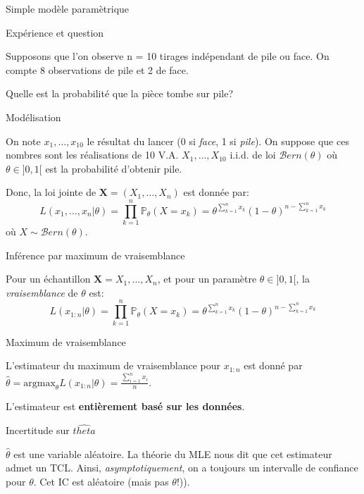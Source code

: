 \documentclass[9pt,ignorenonframetext,]{beamer}
\begin{document}
\begin{frame}{Simple modèle paramètrique}
\protect\hypertarget{simple-moduxe8le-paramuxe8trique}{}

\begin{block}{Expérience et question}

Supposons que l'on observe n = 10 tirages indépendant de pile ou face.
On compte 8 observations de pile et 2 de face.

Quelle est la probabilité que la pièce tombe sur pile?

\end{block}

\begin{block}{Modélisation}

On note \(x_1, \dots, x_{10}\) le résultat du lancer (0 si \emph{face},
1 si \emph{pile}). On suppose que ces nombres sont les réalisations de
10 V.A. \(X_1,\dots,X_{10}\) i.i.d. de loi \(\mathcal{B}ern(\theta)\) où
\(\theta \in ]0, 1[\) est la probabilité d'obtenir pile.

Donc, la loi jointe de \(\mathbf{X} = (X_1,\dots,X_{n})\) est donnée
par:
\[L(x_1,\dots, x_{n}\vert \theta) = \prod_{k = 1}^{n}\mathbb{P}_\theta(X = x_k) = \theta^{\sum_{k=1}^n x_k}\left(1 - \theta \right)^{n - \sum_{k=1}^n x_k}\]
où \(X \sim \mathcal{B}ern(\theta)\).

\end{block}

\end{frame}

\begin{frame}{Inférence par maximum de vraisemblance}
\protect\hypertarget{infuxe9rence-par-maximum-de-vraisemblance}{}

Pour un échantillon \(\mathbf{X} = X_1, \dots, X_n\), et pour un
paramètre \(\theta \in ]0, 1[\), la \emph{vraisemblance} de \(\theta\)
est:
\[L(x_{1:n}\vert \theta) = \prod_{k = 1}^{n}\mathbb{P}_\theta(X = x_k) = \theta^{\sum_{k=1}^n x_k}\left(1 - \theta \right)^{n - \sum_{k=1}^n x_k}\]

\pause

\begin{block}{Maximum de vraisemblance}

L'estimateur du maximum de vraisemblance pour \(x_{1:n}\) est donné par
\(\hat{\theta} = \text{argmax}_{\theta}L(x_{1:n}\vert \theta) = \frac{\sum_{i=1}^n x_i}{n}\).

L'estimateur est \textbf{entièrement basé sur les données}.

\end{block}

\begin{block}{Incertitude sur \(\hat{theta}\)}

\(\hat{\theta}\) est une variable aléatoire. La théorie du MLE nous dit
que cet estimateur admet un TCL. Ainsi, \emph{asymptotiquement}, on a
toujours un intervalle de confiance pour \(\theta\). Cet IC est
aléatoire (mais pas \(\theta\)!)).

\end{block}

\end{frame}
\end{document}
